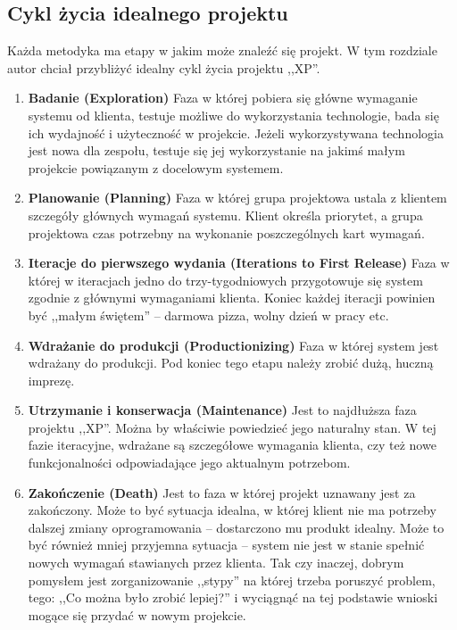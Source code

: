 \subsection{Cykl życia idealnego projektu}
\label{sec:ZMTOcykl}

Każda metodyka ma etapy w jakim może znaleźć się projekt. W tym rozdziale autor chciał przybliżyć idealny cykl życia projektu ,,XP''.

\begin{enumerate}
    \item \textbf{Badanie (Exploration)} Faza w której pobiera się główne wymaganie systemu od klienta, testuje możliwe do wykorzystania technologie, bada się ich wydajność i użyteczność w projekcie. Jeżeli wykorzystywana technologia jest nowa dla zespołu, testuje się jej wykorzystanie na jakimś małym projekcie powiązanym z docelowym systemem.
    \item \textbf{Planowanie (Planning)} Faza w której grupa projektowa ustala z klientem szczegóły głównych wymagań systemu. Klient określa priorytet, a grupa projektowa czas potrzebny na wykonanie poszczególnych kart wymagań.
    \item \textbf{Iteracje do pierwszego wydania (Iterations to First Release)} Faza w której w iteracjach jedno do trzy-tygodniowych przygotowuje się system zgodnie z głównymi wymaganiami klienta. Koniec każdej iteracji powinien być ,,małym świętem'' -- darmowa pizza, wolny dzień w pracy etc.
    \item \textbf{Wdrażanie do produkcji (Productionizing)} Faza w której system jest wdrażany do produkcji. Pod koniec tego etapu należy zrobić dużą, huczną imprezę.
    \item \textbf{Utrzymanie i konserwacja (Maintenance)} Jest to najdłuższa faza projektu ,,XP''. Można by właściwie powiedzieć jego naturalny stan. W tej fazie iteracyjne, wdrażane są szczegółowe wymagania klienta, czy też nowe funkcjonalności odpowiadające jego aktualnym potrzebom.
    \item \textbf{Zakończenie (Death)} Jest to faza w której projekt uznawany jest za zakończony. Może to być sytuacja idealna, w której klient nie ma potrzeby dalszej zmiany oprogramowania -- dostarczono mu produkt idealny. Może to być również mniej przyjemna sytuacja -- system nie jest w stanie spełnić nowych wymagań stawianych przez klienta. Tak czy inaczej, dobrym pomysłem jest zorganizowanie ,,stypy'' na której trzeba poruszyć problem, tego: ,,Co można było zrobić lepiej?'' i wyciągnąć na tej podstawie wnioski mogące się przydać w nowym projekcie.
\end{enumerate}

\newpage
